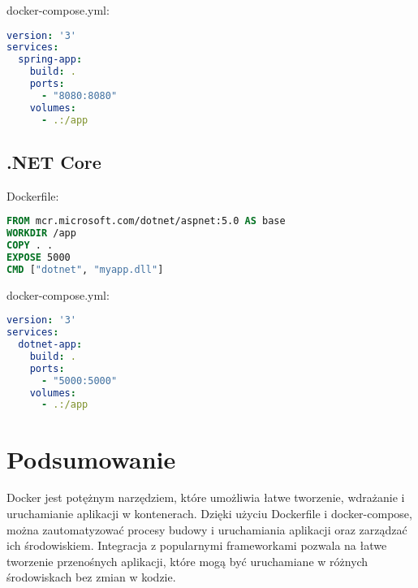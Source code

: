\documentclass[a4paper,12pt]{article}
\begin{document}
docker-compose.yml:
\begin{lstlisting}[language=yaml]
version: '3'
services:
  spring-app:
    build: .
    ports:
      - "8080:8080"
    volumes:
      - .:/app
\end{lstlisting}

\subsection{.NET Core}

Dockerfile:
\begin{lstlisting}[language=Dockerfile]
FROM mcr.microsoft.com/dotnet/aspnet:5.0 AS base
WORKDIR /app
COPY . .
EXPOSE 5000
CMD ["dotnet", "myapp.dll"]
\end{lstlisting}

docker-compose.yml:
\begin{lstlisting}[language=yaml]
version: '3'
services:
  dotnet-app:
    build: .
    ports:
      - "5000:5000"
    volumes:
      - .:/app
\end{lstlisting}

\section{Podsumowanie}
Docker jest potężnym narzędziem, które umożliwia łatwe tworzenie, wdrażanie i uruchamianie aplikacji w kontenerach. Dzięki użyciu Dockerfile i docker-compose, można zautomatyzować procesy budowy i uruchamiania aplikacji oraz zarządzać ich środowiskiem. Integracja z popularnymi frameworkami pozwala na łatwe tworzenie przenośnych aplikacji, które mogą być uruchamiane w różnych środowiskach bez zmian w kodzie.
\end{document}
